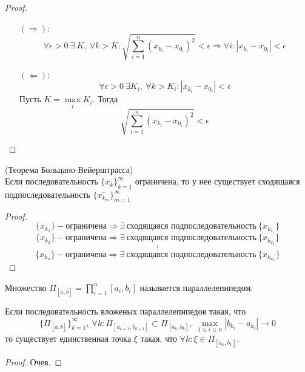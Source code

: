 \begin{proof}\tab
    \begin{itemize}
        \item[$(\Rightarrow)$:] \[\forall \epsilon>0\ \exists\ K,\ \forall k>K: \sqrt{\sum\limits_{i=1}^{n}(x_{k_i}-x_{0_i})^2}<\epsilon \Rightarrow \forall i: |x_{k_i}-x_{0_i}|<\epsilon\]
        \item[$(\Leftarrow)$:] \[\forall \epsilon>0\ \exists K_i,\ \forall k>K_i: |x_{k_i}-x_{0_i}|<\epsilon\]
        Пусть $K=\max\limits_i K_i$. Тогда
        \[\sqrt{\sum\limits_{i=1}^{n}(x_{k_i}-x_{0_i})^2}<\epsilon\]
    \end{itemize}
\end{proof} 
\begin{theorem} (Теорема Больцано-Вейерштрасса)\\
    Если последовательность $\{\bar{x_k}\}_{k=1}^{\infty}$ ограничена, то у нее существует сходящаяся подпоследовательность $\{\bar{x_{k_m}}\}_{m=1}^{\infty}$
\end{theorem} 
\begin{proof}
    \[\{x_{k_1}\} - \text{ограничена} \Rightarrow \exists\ \text{сходящаяся подпоследовательность}\ \{x_{k_{1_1}}\}\]
    \[\{x_{k_2}\} - \text{ограничена} \Rightarrow \exists\ \text{сходящаяся подпоследовательность}\ \{x_{k_{2_2}}\}\]
    \[\vdots\]
    \[\{x_{k_n}\} - \text{ограничена} \Rightarrow \exists\ \text{сходящаяся подпоследовательность}\ \{x_{k_{n_n}}\}\]
\end{proof} 
\begin{definition}
    Множество $\Pi_{[\bar{a}, \bar{b}]}=\prod\limits_{i=1}^{n}[a_i,b_i]$ называется параллелепипедом.
\end{definition} 
\begin{theorem}
    Если последовательность вложеных параллелепипедов такая, что
    \[\{\Pi_{[\bar{a}, \bar{b}]}\}_{k=1}^{\infty},\ \forall k: \Pi_{[\bar{a}_{k+1}, \bar{b}_{k+1}]} \subset \Pi_{[\bar{a}_{k}, \bar{b}_{k}]},\ \max\limits_{1\leq i\leq n}|b_{k_i}-a_{k_i}| \to 0\]
    то существует единственная точка $\xi$ такая, что $\forall k: \xi\in \Pi_{[\bar{a}_k, \bar{b}_k]}$.
\end{theorem} 
\begin{proof}
    Очев.
\end{proof}

